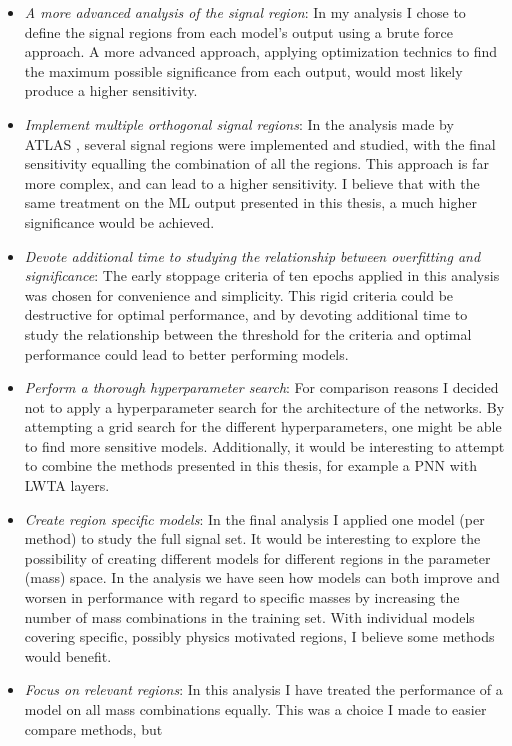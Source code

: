 \begin{itemize}
    \item \emph{A more advanced analysis of the signal region}: In my analysis I chose to define the signal regions from each model's output using a brute force approach. 
          A more advanced approach, applying optimization technics to find the maximum possible significance from each output, would most likely produce a higher sensitivity.
    \item \emph{Implement multiple orthogonal signal regions}: In the analysis made by \ac{ATLAS} \cite{atlas_search_2021}, several signal regions were implemented and studied,
           with the final sensitivity equalling the combination of all the regions. This approach is far more complex, and can lead to a higher sensitivity. I believe that with the same 
           treatment on the \ac{ML} output presented in this thesis, a much higher significance would be achieved. 
    \item \emph{Devote additional time to studying the relationship between overfitting and significance}: The early stoppage criteria of ten epochs applied in this analysis was chosen 
          for convenience and simplicity. This rigid criteria could be destructive for optimal performance, and by devoting additional time to study
          the relationship between the threshold for the criteria and optimal performance could lead to better performing models.
    \item \emph{Perform a thorough hyperparameter search}: For comparison reasons I decided not to apply a hyperparameter search for the architecture of the networks. By attempting 
           a grid search for the different hyperparameters, one might be able to find more sensitive models. Additionally, it would be interesting to attempt to combine the methods presented 
           in this thesis, for example a \ac{PNN} with \ac{LWTA} layers. 
    \item \emph{Create region specific models}: In the final analysis I applied one model (per method) to study the full signal set. It would be interesting to explore the possibility of creating
          different models for different regions in the parameter (mass) space. In the analysis we have seen how models can both improve and worsen in performance with regard to specific masses by increasing
          the number of mass combinations in the training set. With individual models covering specific, possibly physics motivated regions, I believe some methods would benefit.
    \item \emph{Focus on relevant regions}: In this analysis I have treated the performance of a model on all mass combinations equally. This was a choice I made to easier compare methods, but 

\end{itemize}
